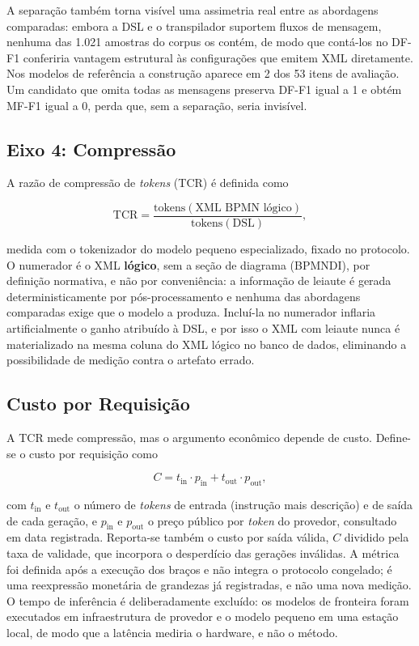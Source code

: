A separação também torna visível uma assimetria real entre as abordagens comparadas: embora a DSL e o transpilador suportem fluxos de mensagem, nenhuma das 1.021 amostras do corpus os contém, de modo que contá-los no DF-F1 conferiria vantagem estrutural às configurações que emitem XML diretamente. Nos modelos de referência a construção aparece em 2 dos 53 itens de avaliação. Um candidato que omita todas as mensagens preserva DF-F1 igual a 1 e obtém MF-F1 igual a 0, perda que, sem a separação, seria invisível.

\subsection{Eixo 4: Compressão}
\label{subsec:eixo4}

A razão de compressão de \textit{tokens} (TCR) é definida como

\begin{equation}
	\text{TCR} = \frac{\text{tokens}(\text{XML BPMN lógico})}{\text{tokens}(\text{DSL})},
\end{equation}

\noindent medida com o tokenizador do modelo pequeno especializado, fixado no protocolo. O numerador é o XML \textbf{lógico}, sem a seção de diagrama (BPMNDI), por definição normativa, e não por conveniência: a informação de leiaute é gerada deterministicamente por pós-processamento e nenhuma das abordagens comparadas exige que o modelo a produza. Incluí-la no numerador inflaria artificialmente o ganho atribuído à DSL, e por isso o XML com leiaute nunca é materializado na mesma coluna do XML lógico no banco de dados, eliminando a possibilidade de medição contra o artefato errado.

\subsection{Custo por Requisição}
\label{subsec:eixo-custo}

A TCR mede compressão, mas o argumento econômico depende de custo. Define-se o custo por requisição como

\begin{equation}
	C = t_{\text{in}} \cdot p_{\text{in}} + t_{\text{out}} \cdot p_{\text{out}},
\end{equation}

\noindent com $t_{\text{in}}$ e $t_{\text{out}}$ o número de \textit{tokens} de entrada (instrução mais descrição) e de saída de cada geração, e $p_{\text{in}}$ e $p_{\text{out}}$ o preço público por \textit{token} do provedor, consultado em data registrada. Reporta-se também o custo por saída válida, $C$ dividido pela taxa de validade, que incorpora o desperdício das gerações inválidas. A métrica foi definida após a execução dos braços e não integra o protocolo congelado; é uma reexpressão monetária de grandezas já registradas, e não uma nova medição. O tempo de inferência é deliberadamente excluído: os modelos de fronteira foram executados em infraestrutura de provedor e o modelo pequeno em uma estação local, de modo que a latência mediria o hardware, e não o método.

